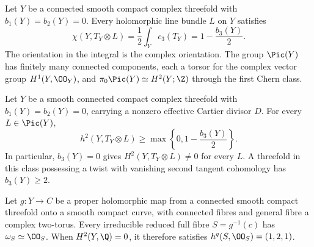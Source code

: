 
\begin{proposition}\hypertarget{tag-01BN}{}\label{cdp:st:C.1.1}

Let $Y$ be a connected smooth compact complex threefold with
$b_1(Y)=b_2(Y)=0$. Every holomorphic line bundle $L$ on $Y$ satisfies
\[
 \chi(Y,T_Y\otimes L)=\frac12\int_Yc_3(T_Y)
 =1-\frac{b_3(Y)}2.
\]
The orientation in the integral is the complex orientation. The group
$\Pic(Y)$ has finitely many connected components, each a torsor for the
complex vector group $H^1(Y,\OO_Y)$, and
$\pi_0\Pic(Y)\simeq H^2(Y;\Z)$ through the first Chern class.
\end{proposition}

\begin{proposition}\hypertarget{tag-01BP}{}\label{cdp:st:C.1.3}

Let $Y$ be a smooth connected compact complex threefold with
$b_1(Y)=b_2(Y)=0$, carrying a nonzero effective Cartier divisor $D$.
For every $L\in\Pic(Y)$,
\[
 h^2(Y,T_Y\otimes L)\geq
 \max\left\{0,1-\frac{b_3(Y)}2\right\}.
\]
In particular, $b_3(Y)=0$ gives $H^2(Y,T_Y\otimes L)\ne0$ for
every $L$. A threefold in this class possessing a twist with vanishing
second tangent cohomology has $b_3(Y)\geq2$.
\end{proposition}

\begin{proposition}\hypertarget{tag-01AT}{}\label{cdp:st:A.4.4}

Let $g:Y\to C$ be a proper holomorphic map from a connected smooth compact threefold onto a smooth compact curve, with connected fibres and general fibre a complex two-torus. Every irreducible reduced full fibre $S=g^{-1}(c)$ has $\omega_S\simeq\OO_S$. When $H^2(Y,\Q)=0$, it therefore satisfies $h^q(S,\OO_S)=(1,2,1)$.
\end{proposition}

